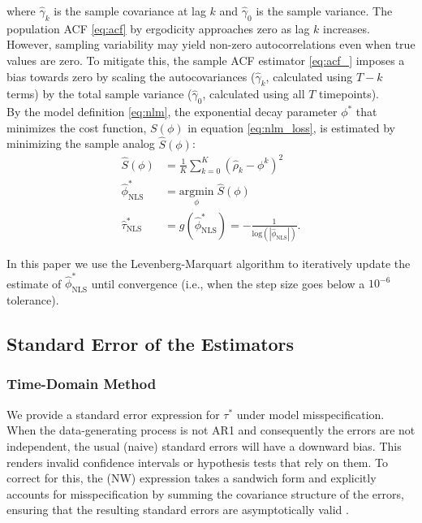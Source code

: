 \documentclass[main.tex]{subfiles}
\begin{document}
\noindent where $\hat\gamma_k$ is the sample covariance at lag $k$ and $\hat\gamma_0$ is the sample variance. The population ACF \eqref{eq:acf} by ergodicity approaches zero as lag $k$ increases. However, sampling variability may yield non-zero autocorrelations even when true values are zero. To mitigate this, the sample ACF estimator \eqref{eq:acf_} imposes a bias towards zero by scaling the autocovariances ($\hat \gamma_k$, calculated using $T-k$ terms) by the total sample variance ($\hat\gamma_0$, calculated using all $T$ timepoints). \\

By the model definition \eqref{eq:nlm}, the exponential decay parameter $\phi^*$ that minimizes the cost function, $S(\phi)$ in equation \eqref{eq:nlm_loss}, is estimated by minimizing the sample analog $\widehat{S}(\phi)$:
\begin{align}
    \widehat{S}(\phi) &= \frac{1}{K} \sum_{k=0}^K (\hat\rho_k - \phi^k)^2 \label{eq:nls_loss_}\\
    \hat \phi^*_{\scriptscriptstyle\text{NLS}} &= \underset{\phi}{\text{argmin}} \; \widehat{S}(\phi) \label{eq:nls_phi_}\\
    \hat \tau^*_{\scriptscriptstyle\text{NLS}} &= g(\hat \phi^*_{\scriptscriptstyle\text{NLS}}) = -\frac{1}{\text{log}(|\hat\phi_{\scriptscriptstyle\text{NLS}}|)}.
\end{align}

\noindent In this paper we use the Levenberg-Marquart algorithm to iteratively update the estimate of $\hat \phi^*_{\scriptscriptstyle\text{NLS}}$ until convergence (i.e., when the step size goes below a $10^{-6}$ tolerance).\\

\subsection{Standard Error of the Estimators}
\subsubsection{Time-Domain Method}\label{sec:stderr-time-domain}
We provide a standard error expression for $\tau^*$ under model misspecification. When the data-generating process is not AR1 and consequently the errors are not independent, the usual (naive) standard errors will have a downward bias. This renders invalid confidence intervals or hypothesis tests that rely on them. To correct for this, the \citet{newey_simple_1987} (NW) expression takes a sandwich form and explicitly accounts for misspecification by summing the covariance structure of the errors, ensuring that the resulting standard errors are asymptotically valid \citep[Theorem 14.32]{hansen_econometrics_2022}.\\
\end{document}
